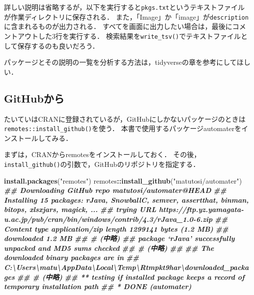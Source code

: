 \documentclass[
]{article}
\newenvironment{Shaded}{\begin{snugshade}}{\end{snugshade}}
\newcommand{\DocumentationTok}[1]{\textcolor[rgb]{0.56,0.35,0.01}{\textbf{\textit{#1}}}}
\newcommand{\FunctionTok}[1]{\textcolor[rgb]{0.13,0.29,0.53}{\textbf{#1}}}
\newcommand{\NormalTok}[1]{#1}
\newcommand{\SpecialCharTok}[1]{\textcolor[rgb]{0.81,0.36,0.00}{\textbf{#1}}}
\newcommand{\StringTok}[1]{\textcolor[rgb]{0.31,0.60,0.02}{#1}}
\begin{document}
詳しい説明は省略するが，以下を実行すると\texttt{pkgs.txt}というテキストファイルが作業ディレクトリに保存される．
また，「Image」か「image」が\texttt{description}に含まれるものが出力される．
すべてを画面に出力したい場合は，最後にコメントアウトした3行を実行する．
検索結果を\texttt{write\_tsv()}でテキストファイルとして保存するのも良いだろう．

パッケージとその説明の一覧を分析する方法は，tidyverseの章を参考にしてほしい．

\hypertarget{github}{%
\subsection{GitHubから}\label{github}}

たいていはCRANに登録されているが，GitHubにしかないパッケージのときは\texttt{remotes::install\_github()}を使う．
本書で使用するパッケージautomaterをインストールしてみる．

まずは，CRANからremotesをインストールしておく．
その後，\texttt{install\_github()}の引数で，GitHubのリポジトリを指定する．

\begin{Shaded}
\begin{Highlighting}[]
\FunctionTok{install.packages}\NormalTok{(}\StringTok{"remotes"}\NormalTok{)}
\NormalTok{remotes}\SpecialCharTok{::}\FunctionTok{install\_github}\NormalTok{(}\StringTok{"matutosi/automater"}\NormalTok{)}
\DocumentationTok{\#\# Downloading GitHub repo matutosi/automater@HEAD}
\DocumentationTok{\#\# Installing 15 packages: rJava, SnowballC, semver, assertthat, binman, bitops, xlsxjars, magick, ...}
\DocumentationTok{\#\# trying URL \textquotesingle{}https://ftp.yz.yamagata{-}u.ac.jp/pub/cran/bin/windows/contrib/4.3/rJava\_1.0{-}6.zip\textquotesingle{}}
\DocumentationTok{\#\# Content type \textquotesingle{}application/zip\textquotesingle{} length 1299141 bytes (1.2 MB)}
\DocumentationTok{\#\# downloaded 1.2 MB}
\DocumentationTok{\#\# \# (中略)}
\DocumentationTok{\#\# package ‘rJava’ successfully unpacked and MD5 sums checked}
\DocumentationTok{\#\# \# (中略)}
\DocumentationTok{\#\# }
\DocumentationTok{\#\# The downloaded binary packages are in}
\DocumentationTok{\#\#         C:\textbackslash{}Users\textbackslash{}matu\textbackslash{}AppData\textbackslash{}Local\textbackslash{}Temp\textbackslash{}Rtmpkt9har\textbackslash{}downloaded\_packages}
\DocumentationTok{\#\# \# (中略)}
\DocumentationTok{\#\# ** testing if installed package keeps a record of temporary installation path}
\DocumentationTok{\#\# * DONE (automater)}
\end{Highlighting}
\end{Shaded}
\end{document}
